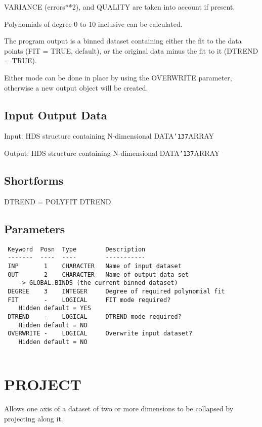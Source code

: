 \documentclass{book}
\renewcommand{\_}{{\tt\char'137}}     %
\begin{document}
VARIANCE (errors**2), and QUALITY are taken into account if present.
 
Polynomials of degree 0 to 10 inclusive can be calculated.
 
The program output is a binned dataset containing either the fit
to the data points (FIT = TRUE, default), or the original data
minus the fit to it (DTREND = TRUE).
 
Either mode can be done in place by using the OVERWRITE
parameter, otherwise a new output object will be created.
 
\subsection{Input Output Data}
Input: HDS structure containing N-dimensional DATA\_ARRAY
 
Output: HDS structure containing N-dimensional DATA\_ARRAY
 
\subsection{Shortforms}
DTREND = POLYFIT DTREND
\subsection{Parameters}
\begin{verbatim}
 Keyword  Posn  Type        Description
 -------  ----  ----        -----------
 INP       1    CHARACTER   Name of input dataset
 OUT       2    CHARACTER   Name of output data set
    -> GLOBAL.BINDS (the current binned dataset)
 DEGREE    3    INTEGER     Degree of required polynomial fit
 FIT       -    LOGICAL     FIT mode required?
    Hidden default = YES
 DTREND    -    LOGICAL     DTREND mode required?
    Hidden default = NO
 OVERWRITE -    LOGICAL     Overwrite input dataset?
    Hidden default = NO
 
\end{verbatim}\section{PROJECT}
Allows one axis of a dataset of two or more dimensions to be
collapsed by projecting along it.
 
\end{document}
